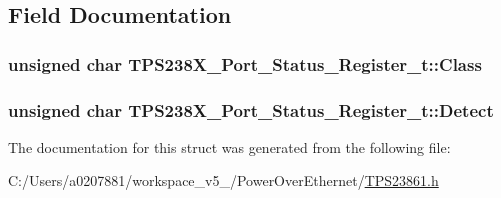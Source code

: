 \subsection{Field Documentation}
\hypertarget{struct_t_p_s238_x___port___status___register__t_af715401a9c923aa942341d91ae57bc5b}{
\subsubsection[{Class}]{\setlength{\rightskip}{0pt plus 5cm}unsigned char T\-P\-S238\-X\-\_\-\-Port\-\_\-\-Status\-\_\-\-Register\-\_\-t\-::\-Class}}\label{struct_t_p_s238_x___port___status___register__t_af715401a9c923aa942341d91ae57bc5b}
\hypertarget{struct_t_p_s238_x___port___status___register__t_ae5d8a4947a39826f24b8b34ccf1d874f}{
\subsubsection[{Detect}]{\setlength{\rightskip}{0pt plus 5cm}unsigned char T\-P\-S238\-X\-\_\-\-Port\-\_\-\-Status\-\_\-\-Register\-\_\-t\-::\-Detect}}\label{struct_t_p_s238_x___port___status___register__t_ae5d8a4947a39826f24b8b34ccf1d874f}


The documentation for this struct was generated from the following file\-:\begin{DoxyCompactItemize}
\item 
C\-:/\-Users/a0207881/workspace\-\_\-v5\-\_/\-Power\-Over\-Ethernet/\hyperlink{_t_p_s23861_8h}{T\-P\-S23861.\-h}\end{DoxyCompactItemize}
